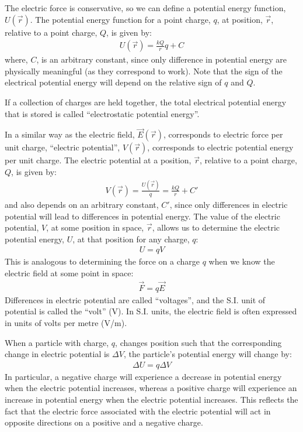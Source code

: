 \begin{chapterSummary}
The electric force is conservative, so we can define a potential energy function, $U(\vec r)$. The potential energy function for a point charge, $q$, at position, $\vec r$, relative to a point charge, $Q$, is given by:
\begin{align*}
U(\vec r) = \frac{kQ}{r}q + C
\end{align*}
where, $C$, is an arbitrary constant, since only difference in potential energy are physically meaningful (as they correspond to work). Note that the sign of the electrical potential energy will depend on the relative sign of $q$ and $Q$. 

If a collection of charges are held together, the total electrical potential energy that is stored is called ``electrostatic potential energy''. 

In a similar way as the electric field, $\vec E(\vec r)$, corresponds to electric force per unit charge, ``electric potential'', $V(\vec r)$, corresponds to electric potential energy per unit charge. The electric potential at a position, $\vec r$, relative to a point charge, $Q$, is given by:
\begin{align*}
V(\vec r) =\frac{U(\vec r)}{q}= \frac{kQ}{r} + C'
\end{align*}
and also depends on an arbitrary constant, $C'$, since only differences in electric potential will lead to differences in potential energy. The value of the electric potential, $V$, at some position in space, $\vec r$, allows us to determine the electric potential energy, $U$, at that position for any charge, $q$:
\begin{align*}
U = qV
\end{align*}
This is analogous to determining the force on a charge $q$ when we know the electric field at some point in space:
\begin{align*}
\vec F = q \vec E
\end{align*}
Differences in electric potential are called ``voltages'', and the S.I. unit of potential is called the ``volt'' (V). In S.I. units, the electric field is often expressed in units of volts per metre (V/m).

When a particle with charge, $q$, changes position such that the corresponding change in electric potential is $\Delta V$, the particle's potential energy will change by:
\begin{align*}
\Delta U = q\Delta V
\end{align*}
In particular, a negative charge will experience a decrease in potential energy when the electric potential increases, whereas a positive charge will experience an increase in potential energy when the electric potential increases. This reflects the fact that the electric force associated with the electric potential will act in opposite directions on a positive and a negative charge. 


\end{chapterSummary}
